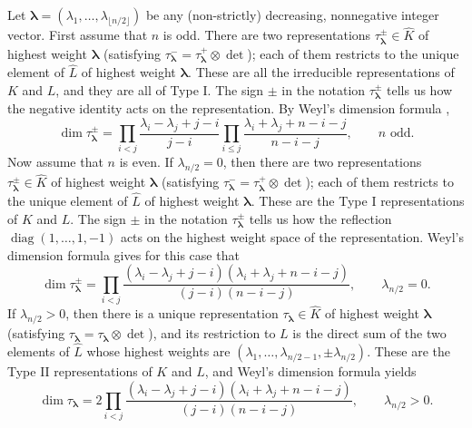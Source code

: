 \documentclass[11pt,oneside]{amsart}
\numberwithin{equation}{section}
\theoremstyle{remark}
\theoremstyle{plain}
\DeclareMathOperator{\diag}{diag}
\renewcommand\leq{\leqslant}
\begin{document}
Let $\bm{\lambda}=(\lambda_1,\dotsc,\lambda_{\lfloor{n/2}\rfloor})$ be any (non-strictly) decreasing, nonnegative integer vector. First assume that $n$ is odd. There are two representations $\tau_{\bm{\lambda}}^\pm\in\widehat{K}$ of highest weight $\bm{\lambda}$ (satisfying $\tau_{\bm{\lambda}}^-=\tau_{\bm{\lambda}}^+\otimes\det$); each of them restricts to the unique element of $\widehat{L}$ of highest weight $\bm{\lambda}$. These are all the irreducible representations of $K$ and $L$, and they are all of Type I. The sign $\pm$ in the notation $\tau_{\bm{\lambda}}^\pm$ tells us how the negative identity acts on the representation. By Weyl's dimension formula \cite[Th.~7.1.9]{GW},
\begin{equation}\label{eq:dimformula_1}
\dim\tau_{\bm{\lambda}}^\pm =
\prod_{i<j} \frac{\lambda_i-\lambda_j+j-i}{j-i} \prod_{i\leq j} \frac{\lambda_i+\lambda_j+n-i-j}{n-i-j},
\qquad\text{$n$ odd}.
\end{equation}
Now assume that $n$ is even. If $\lambda_{n/2}=0$, then there are two representations $\tau_{\bm{\lambda}}^\pm\in\widehat{K}$ of highest weight $\bm{\lambda}$ (satisfying $\tau_{\bm{\lambda}}^-=\tau_{\bm{\lambda}}^+\otimes\det$); each of them restricts to the unique element of $\widehat{L}$ of highest weight $\bm{\lambda}$. These are the Type I representations of $K$ and $L$. The sign $\pm$ in the notation $\tau_{\bm{\lambda}}^\pm$ tells us how the reflection $\diag(1,\dotsc,1,-1)$ acts on the highest weight space of the representation. Weyl's dimension formula gives for this case that
\begin{equation}\label{eq:dimformula_2}
\dim\tau_{\bm{\lambda}}^\pm =
\prod_{i<j} \frac{(\lambda_i-\lambda_j+j-i) (\lambda_i+\lambda_j+n-i-j)} {(j-i)(n-i-j)},
\qquad\lambda_{n/2}=0.
\end{equation}
If $\lambda_{n/2}>0$, then there is a unique representation $\tau_{\bm{\lambda}}\in\widehat{K}$ of highest weight $\bm{\lambda}$ (satisfying $\tau_{\bm{\lambda}}=\tau_{\bm{\lambda}}\otimes\det$), and its restriction to $L$ is the direct sum of the two elements of $\widehat{L}$ whose highest weights are $(\lambda_1,\dotsc,\lambda_{n/2-1},\pm\lambda_{n/2})$. These are the Type II representations of $K$ and $L$, and Weyl's dimension formula yields
\begin{equation}\label{eq:dimformula_3}
\dim\tau_{\bm{\lambda}} =
2\prod_{i<j} \frac{(\lambda_i-\lambda_j+j-i) (\lambda_i+\lambda_j+n-i-j)} {(j-i)(n-i-j)},
\qquad\lambda_{n/2}>0.
\end{equation}
\end{document}
